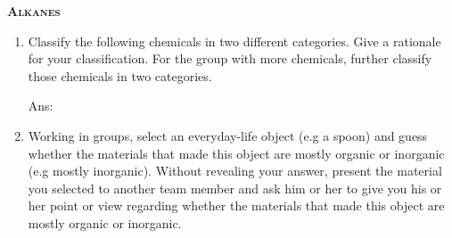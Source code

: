 \documentclass[main.tex]{subfiles}
\begin{document}
\newpage
\setdoublesep{0.35700 em}  %
\setatomsep{1.78500 em}    %
\setbondoffset{0.18265 em} %
\newcommand{\bondwidth}{0.06642 em} %
\setbondstyle{line width = \bondwidth}
\fancyhfoffset[E,O]{0pt}
\setlength{\columnsep}{30pt}
\begin{conclusion}
\end{conclusion}
\begin{multicols*}{2}






{\raggedright\textsc{\textbf{Alkanes}}\par}
\begin{enumerate}

\item Classify the following chemicals in two different categories. Give a rationale for your classification. For the group with more chemicals, further classify those chemicals in two categories.
 \begin{flushright}Ans:
  \end{flushright}

\item Working in groups, select an everyday-life object (e.g  a spoon) and guess whether the materials that made this object are mostly organic or inorganic (e.g mostly inorganic). Without revealing your answer, present the material you selected to another team member and ask him or her to give you his or her point or view regarding whether the materials that made this object are mostly organic or inorganic. 



\end{enumerate}
\end{multicols*}
\end{document}

